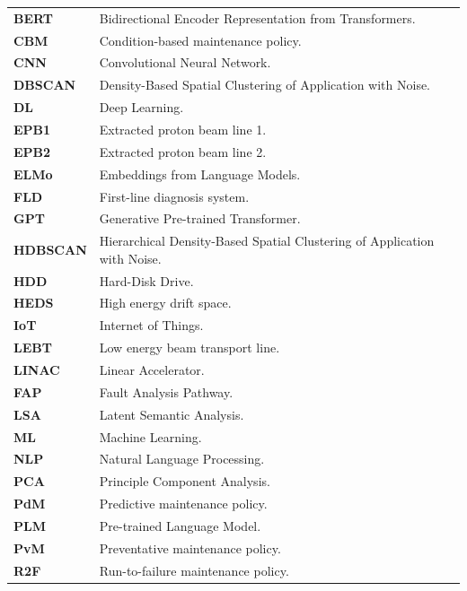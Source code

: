 \documentclass[10pt,oneside]{report}
\begin{document}
\begin{table}[ht]
    \centering
    \begin{tabular}{ll}

        \textbf{BERT} & Bidirectional Encoder Representation from Transformers. \\
        \textbf{CBM} & Condition-based maintenance policy. \\
        \textbf{CNN} & Convolutional Neural Network. \\
        \textbf{DBSCAN} & Density-Based Spatial Clustering of Application with Noise. \\
        \textbf{DL} & Deep Learning. \\
        \textbf{EPB1} & Extracted proton beam line 1. \\
        \textbf{EPB2} & Extracted proton beam line 2. \\
        \textbf{ELMo} & Embeddings from Language Models. \\
        \textbf{FLD} & First-line diagnosis system. \\
        \textbf{GPT} & Generative Pre-trained Transformer. \\
        \textbf{HDBSCAN} & Hierarchical Density-Based Spatial Clustering of Application with Noise. \\
        \textbf{HDD} & Hard-Disk Drive. \\
        \textbf{HEDS} & High energy drift space. \\
        \textbf{IoT} & Internet of Things. \\
        \textbf{LEBT} & Low energy beam transport line. \\
        \textbf{LINAC} & Linear Accelerator. \\
        \textbf{FAP} & Fault Analysis Pathway. \\
        \textbf{LSA} & Latent Semantic Analysis. \\
        \textbf{ML} & Machine Learning. \\
        \textbf{NLP} & Natural Language Processing. \\
        \textbf{PCA} & Principle Component Analysis. \\
        \textbf{PdM} & Predictive maintenance policy. \\
        \textbf{PLM} & Pre-trained Language Model. \\
        \textbf{PvM} & Preventative maintenance policy. \\
        \textbf{R2F} & Run-to-failure maintenance policy. \\

\end{tabular}
\end{table}
\end{document}
